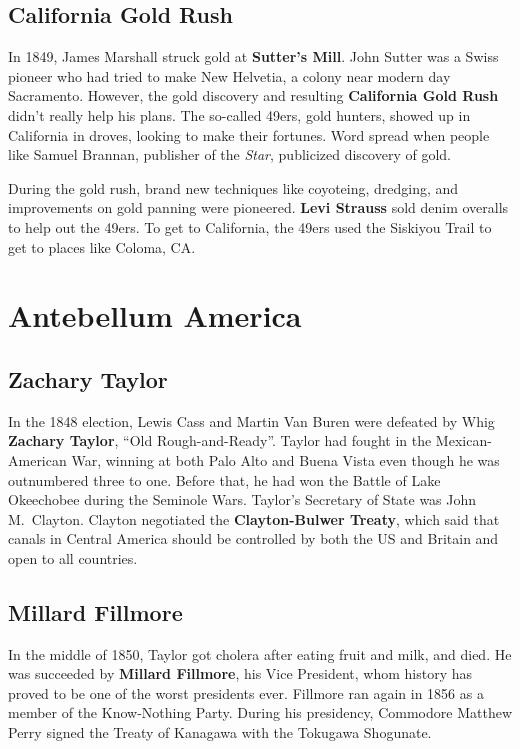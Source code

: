 \subsection*{California Gold Rush}

In 1849, James Marshall struck gold at \textbf{Sutter's Mill}.
John Sutter was a Swiss pioneer who had tried to make New Helvetia, a colony near modern day Sacramento.
However, the gold discovery and resulting \textbf{California Gold Rush} didn't really help his plans.
The so-called 49ers, gold hunters, showed up in California in droves, looking to make their fortunes.
Word spread when people like Samuel Brannan, publisher of the \textit{Star}, publicized discovery of gold.

During the gold rush, brand new techniques like coyoteing, dredging, and improvements on gold panning were pioneered.
\textbf{Levi Strauss} sold denim overalls to help out the 49ers.
To get to California, the 49ers used the Siskiyou Trail to get to places like Coloma, CA\@.

\section{Antebellum America}

\subsection*{Zachary Taylor}

In the 1848 election,
Lewis Cass and Martin Van Buren were defeated by Whig \textbf{Zachary Taylor}, ``Old Rough-and-Ready''.
Taylor had fought in the Mexican-American War,
winning at both Palo Alto and Buena Vista even though he was outnumbered three to one.
Before that, he had won the Battle of Lake Okeechobee during the Seminole Wars.
Taylor's Secretary of State was John M.\ Clayton.
Clayton negotiated the \textbf{Clayton-Bulwer Treaty},
which said that canals in Central America should be controlled by both the US and Britain and open to all countries.

\subsection*{Millard Fillmore}

In the middle of 1850, Taylor got cholera after eating fruit and milk, and died.
He was succeeded by \textbf{Millard Fillmore}, his Vice President,
whom history has proved to be one of the worst presidents ever.
Fillmore ran again in 1856 as a member of the Know-Nothing Party.
During his presidency, Commodore Matthew Perry signed the Treaty of Kanagawa with the Tokugawa Shogunate.

